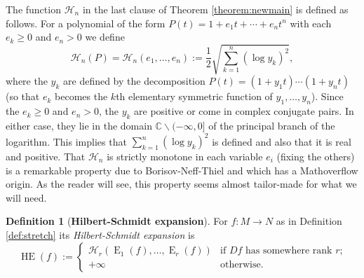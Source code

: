 \documentclass[11pt,letterpaper]{amsart}
\theoremstyle{definition}
\newtheorem{definition}[theorem]{Definition}
\numberwithin{equation}{section}
\theoremstyle{definition}
\newcommand{\Cb}{\mathbb{C}}
\newcommand\ssm{\smallsetminus}
\newcommand{\Hc}{\mathcal{H}}
\DeclareMathOperator{\En}{E}
\DeclareMathOperator{\HE}{HE}
\begin{document}
\medskip
The function $\Hc_n$ in the last clause of Theorem \ref{theorem:newmain} is defined as follows. 
For  a polynomial of the form 
$P(t)=1+e_1t+\cdots +e_{n}t^{n}$  with each $e_k\ge 0$ and $e_n>0$ we define 
\begin{equation}\label{eqn:Hn}
\textstyle \Hc_n(P)=\Hc_n (e_1, \dots, e_{n}):=\frac{1}{2}\sqrt{\sum_{k=1}^n (\log y_k)^2},
\end{equation}
where the $y_k$ are defined by the decomposition $P(t)=(1+y_1t)\cdots (1+y_nt)$ (so that $e_k$ becomes  the $k$th elementary symmetric function of $y_1, \dots, y_n$). Since the $e_k\ge 0$ and $e_n>0$, the $y_k$ are positive or come in complex conjugate pairs.
In either case, they lie in the domain $\Cb\ssm (-\infty, 0]$ of the principal branch of the logarithm. This  implies  that 
$\sum_{k=1}^n (\log y_k)^2$ is defined and also that it is real and positive. That $\Hc_n$ is strictly monotone in each variable $e_i$ (fixing the others) is a remarkable property due to Borisov-Neff-Thiel \cite[Lemma 4.1]{BNST17}  and which has a Mathoverflow origin. As the reader will see,  this property  seems almost tailor-made for what we will need. 

\begin{definition}[{\bf Hilbert-Schmidt expansion}]\label{def:Hstretch}
For $f:M\to N$  as in Definition \ref{def:stretch} its  {\em Hilbert-Schmidt  expansion} is 
\[
\textstyle \HE(f):=
\begin{cases}
\Hc_r(\En_1(f), \dots, \En_r(f)) &\text{if  $Df$ has somewhere rank $r$;}\\
+\infty & \text{otherwise.}
\end{cases}
\]
\end{definition}
\end{document}

